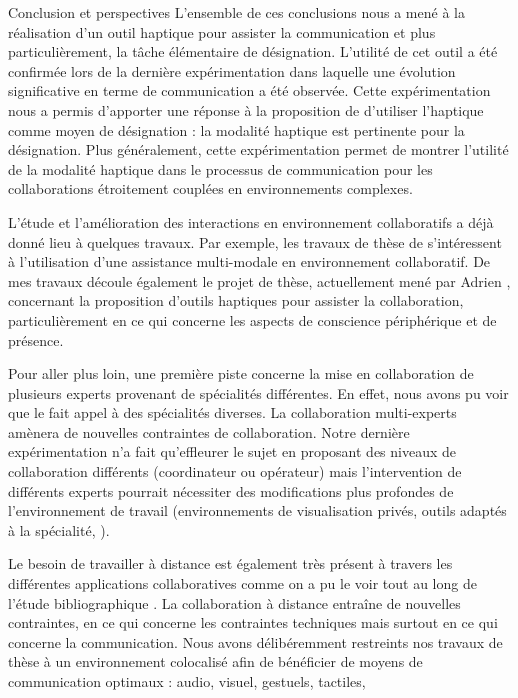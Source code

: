 \documentclass[myfrancais,ngerman,english,french]{mythesis}
\begin{document}
\begin{mychapter+}{Conclusion et perspectives}
		L'ensemble de ces conclusions nous a mené à la réalisation d'un outil haptique pour assister la communication et plus particulièrement, la tâche élémentaire de désignation.
		L'utilité de cet outil a été confirmée lors de la dernière expérimentation  dans laquelle une évolution significative en terme de communication a été observée.
		Cette expérimentation  nous a permis d'apporter une réponse à la proposition de  d'utiliser l'haptique comme moyen de désignation : la modalité haptique est pertinente pour la désignation.
		Plus généralement, cette expérimentation permet de montrer l'utilité de la modalité haptique dans le processus de communication pour les collaborations étroitement couplées en environnements complexes.

		L'étude et l'amélioration des interactions en environnement collaboratifs a déjà donné lieu à quelques travaux.
		Par exemple, les travaux de thèse de  s'intéressent à l'utilisation d'une assistance multi-modale en environnement collaboratif.
		De mes travaux découle également le projet de thèse, actuellement mené par Adrien , concernant la proposition d'outils haptiques pour assister la collaboration, particulièrement en ce qui concerne les aspects de conscience périphérique et de présence.

		Pour aller plus loin, une première piste concerne la mise en collaboration de plusieurs experts provenant de spécialités différentes.
		En effet, nous avons pu voir que le  fait appel à des spécialités diverses.
		La collaboration multi-experts amènera de nouvelles contraintes de collaboration.
		Notre dernière expérimentation n'a fait qu'effleurer le sujet en proposant des niveaux de collaboration différents (coordinateur ou opérateur) mais l'intervention de différents experts pourrait nécessiter des modifications plus profondes de l'environnement de travail (environnements de visualisation privés, outils adaptés à la spécialité, \myetc).

		Le besoin de travailler à distance est également très présent à travers les différentes applications collaboratives comme on a pu le voir tout au long de l'étude bibliographique .
		La collaboration à distance entraîne de nouvelles contraintes, en ce qui concerne les contraintes techniques mais surtout en ce qui concerne la communication.
		Nous avons délibéremment restreints nos travaux de thèse à un environnement colocalisé afin de bénéficier de moyens de communication optimaux : audio, visuel, gestuels, tactiles, \myetc


\end{mychapter+}
\end{document}
